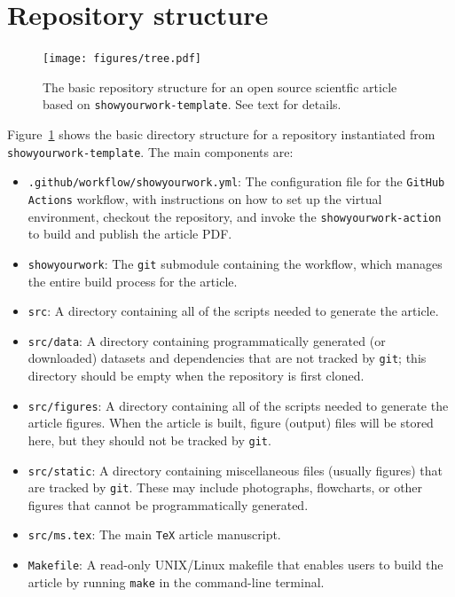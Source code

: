\documentclass[twocolumn]{aastex631}
\begin{document}
\section{Repository structure}
\label{sec:struct}
%
\begin{figure}[ht!]
    \begin{centering}
        \texttt{[image: figures/tree.pdf]}
        \caption{
            The basic repository structure for an open source scientfic article based on \texttt{showyourwork-template}.
            See text for details.
        }
        \label{fig:tree}
    \end{centering}
\end{figure}
%
Figure~\ref{fig:tree} shows the basic directory structure for a repository instantiated from \texttt{showyourwork-template}. 
The main components are:
\begin{itemize}
    \item \texttt{.github/workflow/showyourwork.yml}: The configuration file for the \texttt{GitHub Actions} workflow, with instructions on how to set up the virtual environment, checkout the repository, and invoke the \texttt{showyourwork-action} to build and publish the article PDF.
    \item \texttt{showyourwork}: The \texttt{git} submodule containing the \showyourwork workflow, which manages the entire build process for the article.
    \item \texttt{src}: A directory containing all of the scripts needed to generate the article.
    \item \texttt{src/data}: A directory containing programmatically generated (or downloaded) datasets and dependencies that are not tracked by \texttt{git}; this directory should be empty when the repository is first cloned.
    \item \texttt{src/figures}: A directory containing all of the scripts needed to generate the article figures.
    When the article is built, figure (output) files will be stored here, but they should not be tracked by \texttt{git}.
    \item \texttt{src/static}: A directory containing miscellaneous files (usually figures) that are tracked by \texttt{git}.
    These may include photographs, flowcharts, or other figures that cannot be programmatically generated.
    \item \texttt{src/ms.tex}: The main \texttt{TeX} article manuscript.
    \item \texttt{Makefile}: A read-only UNIX/Linux makefile that enables users to build the article by running \texttt{make} in the command-line terminal.

\end{itemize}
\end{document}
